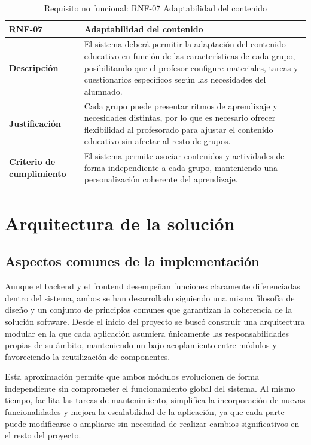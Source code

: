 \begin{table}[H]
\centering
\begin{tabularx}{\textwidth}{
  |>{\centering\arraybackslash}l
  |>{\centering\arraybackslash}X|}
\hline
\textbf{RNF-07} & \textbf{Adaptabilidad del contenido} \\ \hline
\textbf{Descripción} & El sistema deberá permitir la adaptación del contenido educativo en función de las características de cada grupo, posibilitando que el profesor configure materiales, tareas y cuestionarios específicos según las necesidades del alumnado. \\ \hline
\textbf{Justificación} & Cada grupo puede presentar ritmos de aprendizaje y necesidades distintas, por lo que es necesario ofrecer flexibilidad al profesorado para ajustar el contenido educativo sin afectar al resto de grupos. \\ \hline
\textbf{Criterio de cumplimiento} & El sistema permite asociar contenidos y actividades de forma independiente a cada grupo, manteniendo una personalización coherente del aprendizaje. \\ \hline
\end{tabularx}
\caption{Requisito no funcional: RNF-07 Adaptabilidad del contenido}
\end{table}

\section{Arquitectura de la solución}

\subsection{Aspectos comunes de la implementación}

Aunque el backend y el frontend desempeñan funciones claramente diferenciadas dentro del sistema, ambos se han desarrollado siguiendo una misma filosofía de diseño y un conjunto de principios comunes que garantizan la coherencia de la solución software. Desde el inicio del proyecto se buscó construir una arquitectura modular en la que cada aplicación asumiera únicamente las responsabilidades propias de su ámbito, manteniendo un bajo acoplamiento entre módulos y favoreciendo la reutilización de componentes.

Esta aproximación permite que ambos módulos evolucionen de forma independiente sin comprometer el funcionamiento global del sistema. Al mismo tiempo, facilita las tareas de mantenimiento, simplifica la incorporación de nuevas funcionalidades y mejora la escalabilidad de la aplicación, ya que cada parte puede modificarse o ampliarse sin necesidad de realizar cambios significativos en el resto del proyecto.

